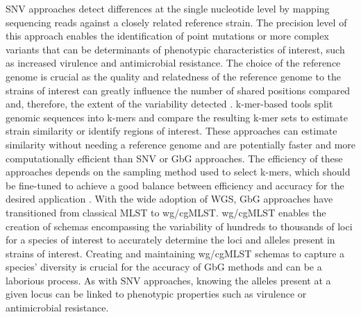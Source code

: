 \ac{SNV} approaches detect differences at the single nucleotide level by mapping sequencing reads against a closely related reference strain. The precision level of this approach enables the identification of point mutations or more complex variants that can be determinants of phenotypic characteristics of interest, such as increased virulence and antimicrobial resistance. The choice of the reference genome is crucial as the quality and relatedness of the reference genome to the strains of interest can greatly influence the number of shared positions compared and, therefore, the extent of the variability detected \citep{bush_genomic_2020, valiente-mullor_one_2021}. k-mer-based tools split genomic sequences into k-mers and compare the resulting k-mer sets to estimate strain similarity or identify regions of interest. These approaches can estimate similarity without needing a reference genome and are potentially faster and more computationally efficient than \ac{SNV} or \ac{GbG} approaches. The efficiency of these approaches depends on the sampling method used to select k-mers, which should be fine-tuned to achieve a good balance between efficiency and accuracy for the desired application \citep{ndiaye_when_2024, belbasi_minimizer_2022}. With the wide adoption of \ac{WGS}, \ac{GbG} approaches have transitioned from classical \ac{MLST} to \ac{wg/cgMLST}. \ac{wg/cgMLST} enables the creation of schemas encompassing the variability of hundreds to thousands of loci for a species of interest to accurately determine the loci and alleles present in strains of interest. Creating and maintaining \ac{wg/cgMLST} schemas to capture a species' diversity is crucial for the accuracy of \ac{GbG} methods and can be a laborious process. As with \ac{SNV} approaches, knowing the alleles present at a given locus can be linked to phenotypic properties such as virulence or antimicrobial resistance.

